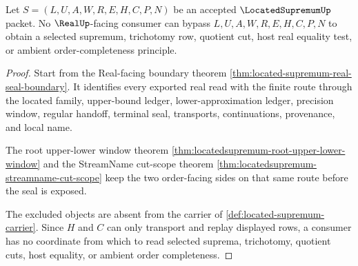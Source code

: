 \begin{theorem}
\label{thm:locatedsupremum-real-seal-nonescape}
Let $S=(L,U,A,W,R,E,H,C,P,N)$ be an accepted $\LocatedSupremumUp$ packet. No $\RealUp$-facing consumer can bypass $L,U,A,W,R,E,H,C,P,N$ to obtain a selected supremum, trichotomy row, quotient cut, host real equality test, or ambient order-completeness principle.
\end{theorem}
\begin{proof}
Start from the Real-facing boundary theorem \autoref{thm:located-supremum-real-seal-boundary}. It identifies every exported real read with the finite route through the located family, upper-bound ledger, lower-approximation ledger, precision window, regular handoff, terminal seal, transports, continuations, provenance, and local name.

The root upper-lower window theorem \autoref{thm:locatedsupremum-root-upper-lower-window} and the StreamName cut-scope theorem \autoref{thm:locatedsupremum-streamname-cut-scope} keep the two order-facing sides on that same route before the seal is exposed.

The excluded objects are absent from the carrier of \autoref{def:located-supremum-carrier}. Since $H$ and $C$ can only transport and replay displayed rows, a consumer has no coordinate from which to read selected suprema, trichotomy, quotient cuts, host equality, or ambient order completeness.
\end{proof}

